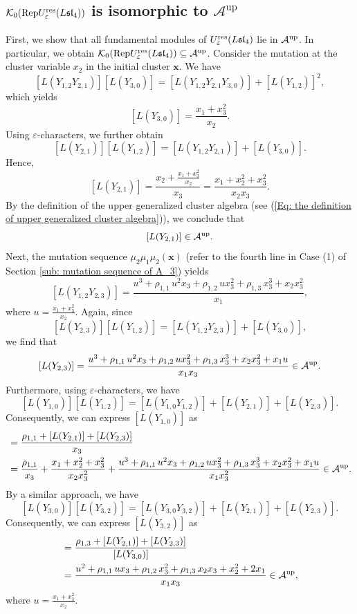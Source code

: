 \documentclass[11pt, reqno]{amsart}
\theoremstyle{plain}
\theoremstyle{definition}
\numberwithin{equation}{section}
\newcommand{\res}{{\rm res}}
\newcommand{\Rep}{{\rm Rep}}
\begin{document}
\subsection{\texorpdfstring{$\mathcal{K}_0(\Rep U_{\varepsilon}^{\res}({L\mathfrak{sl}_{4}}))$ is isomorphic to $\mathcal{A}^{\mathrm{up}}$}{Grothendieck ring is isomorphic to upper generalized cluster algebra}}  \label{subsec:Grothendieck ring in type A3 is isomorphic to upper cluster algebra}
First, we show that all fundamental modules of $U_\varepsilon^{\res}(L\mathfrak{sl}_4)$ lie in $\mathcal{A}^{\rm up}$. In particular, we obtain $\mathcal{K}_0(\Rep U_{\varepsilon}^{\res}(L\mathfrak{sl}_4)) \subseteq \mathcal{A}^{\mathrm{up}}$. Consider the mutation at the cluster variable $x_2$ in the initial cluster $\mathbf{x}$. We have
\[
[L(Y_{1,2}Y_{2,1})][L(Y_{3,0})]
=[L(Y_{1,2}Y_{2,1}Y_{3,0})]+[L(Y_{1,2})]^2,
\]
which yields
\[
[L(Y_{3,0})]=\frac{x_1+x_3^2}{x_2}.
\]
Using $\varepsilon$-characters, we further obtain
\[
[L(Y_{2,1})][L(Y_{1,2})]=[L(Y_{1,2}Y_{2,1})]+[L(Y_{3,0})].
\]
Hence,
\[
[L(Y_{2,1})]=\frac{x_2+\frac{x_1+x_3^2}{x_2}}{x_3}=\frac{x_1+x_2^2+x_3^2}{x_2x_3}.
\]
By the definition of the upper generalized cluster algebra (see (\ref{Eq: the definition of upper generalized cluster algebra})), we conclude that
\[
[L(Y_{2,1})]\in \mathcal{A}^{\rm up}.
\]
Next, the mutation sequence $\mu_2\mu_1\mu_2(\mathbf{x})$ (refer to the fourth line in Case (1) of Section \ref{sub: mutation sequence of A_3}) yields 
\[
[L(Y_{1,2}Y_{2,3})]=\frac{u^3+\rho_{1,1}\,u^2x_3+\rho_{1,2}\,ux^2_3+\rho_{1,3}\,x^3_3+x_2x^2_3}{x_1},
\]
where $u=\frac{x_1+x^2_3}{x_2}$. Again, since 
\[
[L(Y_{2,3})][L(Y_{1,2})]=[L(Y_{1,2}Y_{2,3})]+[L(Y_{3,0})],
\]
we find that
\[
[L(Y_{2,3})]=\frac{u^3+\rho_{1,1}\,u^2x_3+\rho_{1,2}\,ux^2_3+\rho_{1,3}\,x^3_3+x_2x^2_3+x_1u}{x_1x_3}\in \mathcal{A}^{\rm up}.
\]
Furthermore, using $\varepsilon$-characters, we have
\[
[L(Y_{1,0})][L(Y_{1,2})]=[L(Y_{1,0}Y_{1,2})]+[L(Y_{2,1})]+[L(Y_{2,3})].
\]
Consequently, we can express $[L(Y_{1,0})]$ as
\begin{align*}
[L(Y_{1,0})]&=\frac{\rho_{1,1}+[L(Y_{2,1})]+[L(Y_{2,3})]}{x_3}\\
            &=\frac{\rho_{1,1}}{x_3}+\frac{x_1+x^2_2+x^2_3}{x_2x^2_3}+\frac{u^3+\rho_{1,1}\,u^2x_3+\rho_{1,2}\,ux^2_3+\rho_{1,3}\,x^3_3+x_2x^2_3+x_1u}{x_1x^2_3}\in \mathcal{A}^{\rm up}.
\end{align*}
By a similar approach, we have 
\[
[L(Y_{3,0})][L(Y_{3,2})]=[L(Y_{3,0}Y_{3,2})]+[L(Y_{2,1})]+[L(Y_{2,3})].
\]
Consequently, we can express $[L(Y_{3,2})]$ as
\begin{align*}
[L(Y_{3,2})]&=\frac{\rho_{1,3}+[L(Y_{2,1})]+[L(Y_{2,3})]}{[L(Y_{3,0})]}\\
            &=\frac{u^2+\rho_{1,1}\,ux_3+\rho_{1,2}\,x^2_3+\rho_{1,3}\,x_2x_3+x^2_2+2x_1}{x_1x_3}\in \mathcal{A}^{\rm up},
\end{align*}
where $u=\frac{x_1+x^2_3}{x_2}$.
\end{document}
